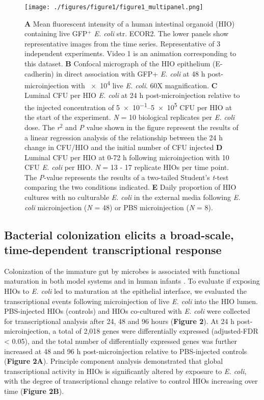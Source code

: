 \documentclass[9pt,lineo]{elife}
\begin{document}
\begin{figure}
\begin{fullwidth}
\texttt{[image: ./figures/figure1/figure1\_multipanel.png]}
\caption{\textbf{A} Mean fluorescent intensity of a human intestinal organoid (HIO) containing live GFP$^{+}$ \textit{E. coli} str. ECOR2.  The lower panels show representative images from the time series. Representative of 3 independent experiments. Video 1 is an animation corresponding to this dataset. \textbf{B} Confocal micrograph of the HIO epithelium (E-cadherin) in direct association with GFP+ \textit{E. coli} at 48 h post-microinjection with \num{e4} live \textit{E. coli}. 60X magnification. \textbf{C} Luminal CFU per HIO \textit{E. coli} at 24 h post-microinjection relative to the injected concentration of \numrange{5e-1}{5e5} CFU per HIO at the start of the experiment. \textit{N} = 10 biological replicates per \textit{E. coli} dose. The \textit{r}$^{2}$ and \textit{P} value shown in the figure represent the results of a linear regression analysis of the relationship between the 24 h change in CFU/HIO and the initial number of CFU injected \textbf{D} Luminal CFU per HIO at 0-72 h following microinjection with 10 CFU \textit{E. coli} per HIO. \textit{N} = 13 - 17 replicate HIOs per time point. The \textit{P}-value represents the results of a two-tailed Student's \textit{t}-test comparing the two conditions indicated. \textbf{E} Daily proportion of HIO cultures with no culturable \textit{E. coli} in the external media following \textit{E. coli} microinjection (\textit{N} = 48) or PBS microinjection (\textit{N} = 8).}
\label{fig:fullwidth}
\end{fullwidth}
\end{figure}

\subsection*{{\bfseries\sffamily } Bacterial colonization elicits a broad-scale, time-dependent transcriptional response}
\label{sec:orgheadline4}
Colonization of the immature gut by microbes is associated with functional maturation in both model systems\citep{Kremer:2013,Sommer:2015,Broderick:2014,Erkosar:2015} and in human infants \citep{Renz:2012}. To evaluate if exposing HIOs to \emph{E. coli} led to maturation at the epithelial interface, we evaluated the transcriptional events following microinjection of live \emph{E. coli}  into the HIO lumen. PBS-injected HIOs (controls) and HIOs co-cultured with \emph{E. coli} were collected for transcriptional analysis after 24, 48 and 96 hours (\textbf{Figure 2}). At 24 h post-microinjection, a total of 2,018 genes were differentially expressed (adjusted-FDR < 0.05), and the total number of differentially expressed genes was further increased at 48 and 96 h post-microinjection relative to PBS-injected controls (\textbf{Figure 2A}). Principle component analysis demonstrated that global transcriptional activity in HIOs is significantly altered by exposure to \emph{E. coli}, with the degree of transcriptional change relative to control HIOs increasing over time (\textbf{Figure 2B}).
\end{document}
